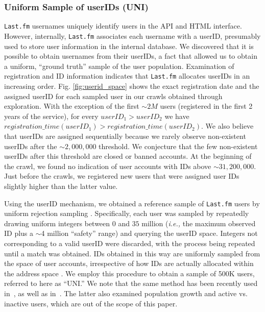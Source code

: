 \documentclass[10pt, conference]{./IEEEtran}
\newcommand{\ie}{{\em i.e., }}
\newcommand{\lastfm}{{\tt Last.fm}\xspace}
\begin{document}
\subsubsection{Uniform Sample of userIDs (UNI)\label{sec:mg_uni}}


\lastfm usernames uniquely identify users in the API and HTML interface. However, internally, \lastfm associates each username with a userID,  presumably used to store  user information in the internal database.  We discovered that it is possible to obtain usernames from their userIDs, a fact that allowed us to obtain a uniform, ``ground truth'' sample of the user population.  Examination of registration and ID information indicates that \lastfm allocates userIDs in an increasing order. Fig. \ref{fig:userid_space} shows the exact registration date and the assigned userID for each sampled user in our crawls obtained through exploration.  With the exception of the first $\sim2M$ users (registered in the first 2 years of the service), for every $userID_1>userID_2$  we have $registration\_time(userID_1) > registration\_time(userID_2)$. We also believe that userIDs are assigned sequentially because we rarely observe non-existent userIDs  after the $\sim2,000,000$ threshold. We conjecture that the few non-existent userIDs after this threshold are closed or banned accounts. At the beginning of the crawl, we found no indication of user accounts  with IDs above $\sim31,200,000$. Just before the crawls, we registered new users that were assigned user IDs slightly higher than the latter value.

Using the userID mechanism, we obtained a reference sample of \lastfm users by uniform rejection sampling \cite{leon-garcia}.  Specifically, each user was sampled by repeatedly drawing uniform integers between $0$ and $35$ million (\ie the maximum observed ID plus a $\sim$4 million ``safety'' range) and querying the userID space.  Integers not corresponding to a valid userID were discarded, with the process being repeated until a match was obtained. IDs obtained in this way are uniformly sampled from the space of user accounts, irrespective of how IDs are actually allocated within the address space \cite{Gjoka2011_multigraph_JSAC}.  We employ this procedure to obtain a sample of 500K users, referred to here as ``UNI.''
%
We note that the same method has been recently used in~\cite{Gjoka2010}, as well as in~\cite{Rejaie2010}. The latter also examined population growth and active vs. inactive users, which are out of the scope of this paper.
%
%
%
%
\end{document}
